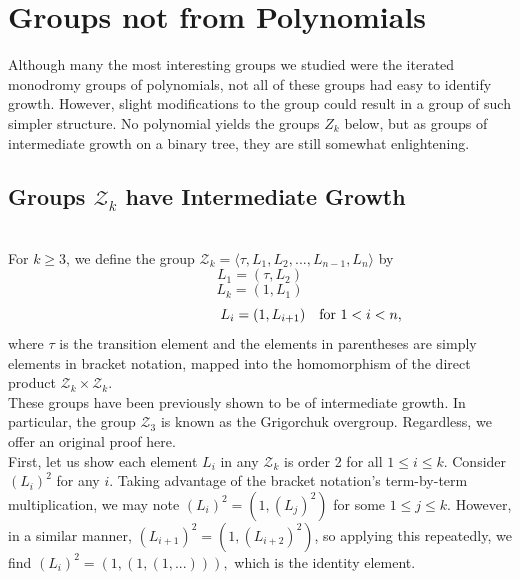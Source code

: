 \documentclass[11pt]{amsart}
\theoremstyle{definition}
\theoremstyle{remark}
\numberwithin{equation}{section}
\begin{document}
\section{Groups not from Polynomials}

\indent Although many the most interesting groups we studied were the iterated monodromy groups of polynomials, not all of these groups had easy to identify growth. However, slight modifications to the group could result in a group of such simpler structure. No polynomial yields the groups $Z_k$ below, but as groups of intermediate growth on a binary tree, they are still somewhat enlightening.\\

\subsection{Groups $\mathcal{Z}_k$ have Intermediate Growth} \text{\space}\\


\indent For $k\geq 3$, we define the group $\mathcal{Z}_k=\langle \tau, L_1,L_2,...,L_{n-1},L_n \rangle$ by $$L_1=(\tau,L_2)$$ $$L_k=(1,L_1)$$ $$\text{\space}\text{\space}\text{\space}\text{\space}\text{\space}\text{\space}
\text{\space}\text{\space}\text{\space}\text{\space}\text{\space}\text{\space}
\text{\space}\text{\space}\text{\space}\text{\space}\text{\space}\text{\space}
\text{\space}\text{\space}\text{\space}\text{\space}L_i=(1,L_{i+1}) \text{\space}\text{\space}\text{\space} \text{for }1<i<n,$$
where $\tau$ is the transition element and the elements in parentheses are simply elements in bracket notation, mapped into the homomorphism of the direct product $\mathcal{Z}_k\times \mathcal{Z}_k$.\\

\indent These groups have been previously shown to be of intermediate growth. In particular, the group $\mathcal{Z}_3$ is known as the Grigorchuk overgroup. Regardless, we offer an original proof here.\\

\indent First, let us show each element $L_i$ in any $\mathcal{Z}_k$ is order 2 for all $1\leq i\leq k$. Consider $(L_i)^2$ for any $i$. Taking advantage of the bracket notation's term-by-term multiplication, we may note $(L_i)^2=(1,(L_{j})^2)$ for some $1\leq j\leq k$. However, in a similar manner, $(L_{i+1})^2=(1,(L_{i+2})^2)$, so applying this repeatedly, we find $(L_i)^2=(1,(1,(1,...))),$ which is the identity element.\\
\end{document}
